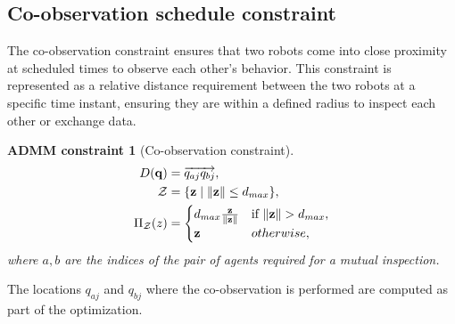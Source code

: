 \documentclass[10pt,twocolumn,twoside]{IEEEtran}
\newtheorem{constraint}{ADMM constraint}
\def\sZ{\mathcal{Z}}
\begin{document}

\subsection{Co-observation schedule constraint}\label{sec:co-observation-constraint}
The co-observation constraint ensures that two robots come into close proximity at scheduled times to observe each other's behavior. This constraint is represented as a relative distance requirement between the two robots at a specific time instant, ensuring they are within a defined radius to inspect each other or exchange data. %


\begin{constraint}[Co-observation constraint]\label{constraint:coobservation}
\begin{align}
D(\vq) &= \overrightarrow{q_{aj}q_{bj}}, \label{eq:coobservation_constraint}\\
  \sZ &= \{\vz \mid \norm{\vz} \leq d_{max} \},\\
   \Pi_\sZ(z) & = \begin{cases}
d_{max}\frac{\vz}{\norm{\vz}} &\text{if } \norm{\vz} > d_{max},\\
\vz	& otherwise,
\end{cases}
\end{align}
where $a,b$ are the indices of the pair of agents required for a mutual inspection.
\end{constraint}
The locations $q_{aj}$ and $q_{bj}$ where the co-observation is performed are computed as part of the optimization.
\end{document}
